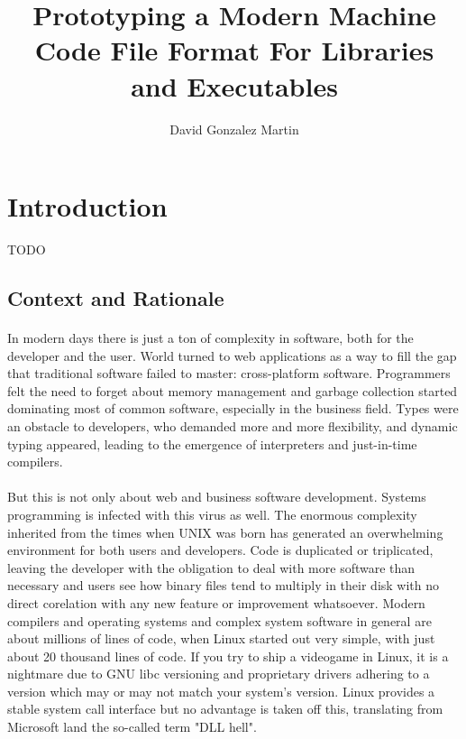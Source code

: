 \documentclass[12pt]{article}
\title{\vspace{-2.5cm}\textbf{Prototyping a Modern Machine Code File Format For Libraries and Executables}}
\author{David Gonzalez Martin}
\date{\vspace{-5ex}}
\begin{document}
	\maketitle{\vspace{-1.5cm}}
	\newpage
	\tableofcontents
	\newpage
	\section{Introduction}
    TODO
	\subsection{Context and Rationale}
	\paragraph{}In modern days there is just a ton of complexity in software, both for the developer and the user. World turned to web applications as a way to fill the gap that traditional software failed to master: cross-platform software. Programmers felt the need to forget about memory management and garbage collection started dominating most of common software, especially in the business field. Types were an obstacle to developers, who demanded more and more flexibility, and dynamic typing appeared, leading to the emergence of interpreters and just-in-time compilers.
	\paragraph{}But this is not only about web and business software development. Systems programming is infected with this virus as well. The enormous complexity inherited from the times when UNIX was born has generated an overwhelming environment for both users and developers. Code is duplicated or triplicated, leaving the developer with the obligation to deal with more software than necessary and users see how binary files tend to multiply in their disk with no direct corelation with any new feature or improvement whatsoever. Modern compilers and operating systems and complex system software in general are about millions of lines of code, when Linux started out very simple, with just about 20 thousand lines of code. If you try to ship a videogame in Linux, it is a nightmare due to GNU libc versioning and proprietary drivers adhering to a version which may or may not match your system's version. Linux provides a stable system call interface but no advantage is taken off this, translating from Microsoft land the so-called term "DLL hell".
\end{document}
